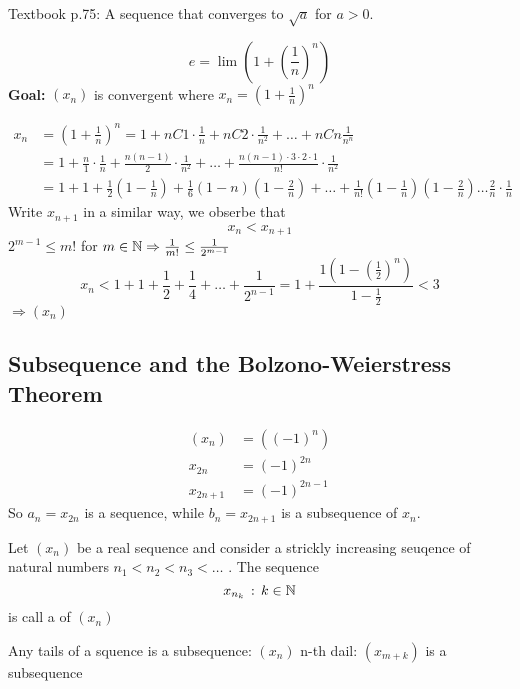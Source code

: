 \documentclass[a4paper,12pt]{article}
\begin{document}
Textbook p.75: A sequence that converges to \(\sqrt{a}\) for \(a>0\).\newpage
\begin{definition}
    \[e = \lim(1+(\frac{1}{n})^n)\]
    \textbf{Goal: } \((x_n)\) is convergent where \(x_n=(1+\frac{1}{n})^n\)
    
    \begin{align*}
        x_n & = (1+\frac{1}{n})^n=1+nC1\cdot\frac{1}{n}+nC2\cdot\frac{1}{n^2}+\dots+nCn\frac{1}{n^n}\\
        & = 1+\frac{n}{1}\cdot\frac{1}{n}+\frac{n(n-1)}{2}\cdot\frac{1}{n^2}+\dots+\frac{n(n-1)\cdot3\cdot2\cdot1}{n!}\cdot\frac{1}{n^2}\\   
        & = 1 + 1+\frac{1}{2}(1-\frac{1}{n})+\frac{1}{6}(1-n)(1-\frac{2}{n})+\dots+\frac{1}{n!}(1-\frac{1}{n})(1-\frac{2}{n})\dots\frac{2}{n}\cdot\frac{1}{n}
    \end{align*}
    Write \(x_{n+1}\) in a similar way, we obserbe that \[x_n < x_{n+1}\]
     \(2^{m-1}\le m!\) for \(m \in \mathbb{N}\Rightarrow \frac{1}{m!}\le\frac{1}{2^{m-1}}\)
    \[x_n<1+1+\frac{1}{2}+\frac{1}{4}+\dots+\frac{1}{2^{n-1}} = 1+\frac{1(1-(\frac{1}{2})^n)}{1-\frac{1}{2}}<3\]
    \(\Rightarrow(x_n) \)
\end{definition}

\newpage

\subsection{Subsequence and the Bolzono-Weierstress Theorem}
    \begin{example}
        \begin{align*}
            (x_n) &= ((-1)^n)\\
            x_{2n} &= (-1)^{2n}\\
            x_{2n+1} &= (-1)^{2n-1}
        \end{align*}
        So \(a_n = x_{2n}\) is a sequence, while \(b_n = x_{2n+1}\) is a subsequence of \(x_n\).
    \end{example}

    \begin{definition}
        Let \((x_n)\) be a real sequence and consider a strickly increasing seuqence of natural numbers 
        \(n_1<n_2<n_3<\dots\)
        . The sequence \[x_{n_k}\,:\,k\in\mathbb{N}\]
        is call a  of \((x_n)\)
    \end{definition}
    \begin{example}
        Any tails of a squence is a subsequence:
        \((x_n)\) n-th dail: \((x_{m+k})\) is a subsequence
    \end{example}
\end{document}
